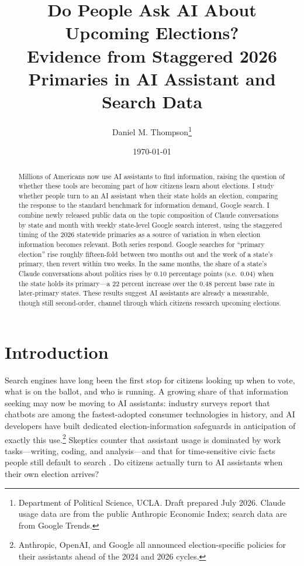 \documentclass[12pt]{article}
\title{Do People Ask AI About Upcoming Elections?\\
\large Evidence from Staggered 2026 Primaries in AI Assistant and Search Data}
\author{Daniel M. Thompson\thanks{Department of Political Science, UCLA. Draft prepared July 2026. Claude usage data are from the public Anthropic Economic Index; search data are from Google Trends.}}
\date{\today}
\begin{document}
\maketitle

\begin{abstract}
\noindent Millions of Americans now use AI assistants to find information, raising the question of whether these tools are becoming part of how citizens learn about elections. I study whether people turn to an AI assistant when their state holds an election, comparing the response to the standard benchmark for information demand, Google search. I combine newly released public data on the topic composition of Claude conversations by state and month with weekly state-level Google search interest, using the staggered timing of the 2026 statewide primaries as a source of variation in when election information becomes relevant. Both series respond. Google searches for ``primary election'' rise roughly fifteen-fold between two months out and the week of a state's primary, then revert within two weeks. In the same months, the share of a state's Claude conversations about politics rises by 0.10 percentage points (s.e.\ 0.04) when the state holds its primary---a 22 percent increase over the 0.48 percent base rate in later-primary states. These results suggest AI assistants are already a measurable, though still second-order, channel through which citizens research upcoming elections.
\end{abstract}

\onehalfspacing

\section*{Introduction}

Search engines have long been the first stop for citizens looking up when to vote, what is on the ballot, and who is running. A growing share of that information seeking may now be moving to AI assistants: industry surveys report that chatbots are among the fastest-adopted consumer technologies in history, and AI developers have built dedicated election-information safeguards in anticipation of exactly this use.\footnote{Anthropic, OpenAI, and Google all announced election-specific policies for their assistants ahead of the 2024 and 2026 cycles.} Skeptics counter that assistant usage is dominated by work tasks---writing, coding, and analysis---and that for time-sensitive civic facts people still default to search \citep{handa2025economic}. Do citizens actually turn to AI assistants when their own election arrives?
\end{document}
